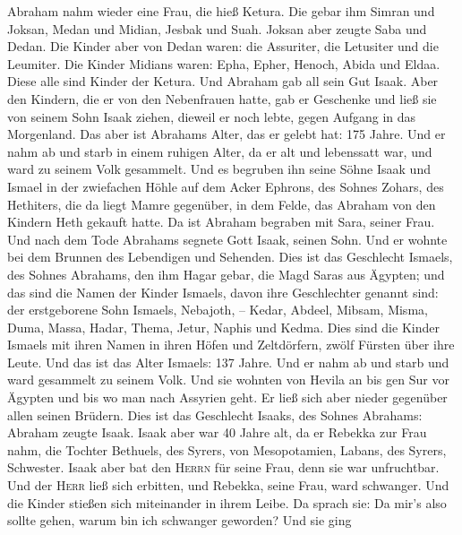  Abraham nahm wieder eine Frau, die hieß Ketura.
 Die gebar ihm Simran und Joksan, Medan und Midian, Jesbak
und Suah.  Joksan aber zeugte Saba und Dedan. Die Kinder
aber von Dedan waren: die Assuriter, die Letusiter und die Leumiter.
 Die Kinder Midians waren: Epha, Epher, Henoch, Abida und
Eldaa. Diese alle sind Kinder der Ketura.  Und Abraham gab
all sein Gut Isaak.  Aber den Kindern, die er von den
Nebenfrauen hatte, gab er Geschenke und ließ sie von seinem Sohn Isaak
ziehen, dieweil er noch lebte, gegen Aufgang in das Morgenland.
 Das aber ist Abrahams Alter, das er gelebt hat: 175
Jahre.  Und er nahm ab und starb in einem ruhigen Alter,
da er alt und lebenssatt war, und ward zu seinem Volk gesammelt.
 Und es begruben ihn seine Söhne Isaak und Ismael in der
zwiefachen Höhle auf dem Acker Ephrons, des Sohnes Zohars, des
Hethiters, die da liegt Mamre gegenüber,  in dem Felde,
das Abraham von den Kindern Heth gekauft hatte. Da ist Abraham begraben
mit Sara, seiner Frau.  Und nach dem Tode Abrahams
segnete Gott Isaak, seinen Sohn. Und er wohnte bei dem Brunnen des
Lebendigen und Sehenden.  Dies ist das Geschlecht
Ismaels, des Sohnes Abrahams, den ihm Hagar gebar, die Magd Saras aus
Ägypten;  und das sind die Namen der Kinder Ismaels,
davon ihre Geschlechter genannt sind: der erstgeborene Sohn Ismaels,
Nebajoth, -- Kedar, Abdeel, Mibsam,  Misma, Duma, Massa,
 Hadar, Thema, Jetur, Naphis und Kedma. 
Dies sind die Kinder Ismaels mit ihren Namen in ihren Höfen und
Zeltdörfern, zwölf Fürsten über ihre Leute.  Und das ist
das Alter Ismaels: 137 Jahre. Und er nahm ab und starb und ward
gesammelt zu seinem Volk.  Und sie wohnten von Hevila an
bis gen Sur vor Ägypten und bis wo man nach Assyrien geht. Er ließ sich
aber nieder gegenüber allen seinen Brüdern.  Dies ist das
Geschlecht Isaaks, des Sohnes Abrahams: Abraham zeugte Isaak.
 Isaak aber war 40 Jahre alt, da er Rebekka zur Frau
nahm, die Tochter Bethuels, des Syrers, von Mesopotamien, Labans, des
Syrers, Schwester.  Isaak aber bat den \textsc{Herrn} für
seine Frau, denn sie war unfruchtbar. Und der \textsc{Herr} ließ sich
erbitten, und Rebekka, seine Frau, ward schwanger.  Und
die Kinder stießen sich miteinander in ihrem Leibe. Da sprach sie: Da
mir's also sollte gehen, warum bin ich schwanger geworden? Und sie ging
